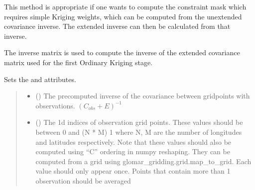 \documentclass[letterpaper,10pt,english]{sphinxmanual}
\begin{document}
\begin{fulllineitems}
\begin{fulllineitems}
\sphinxAtStartPar
This method is appropriate if one wants to compute the constraint mask
which requires simple Kriging weights, which can be computed from the
unextended covariance inverse. The extended inverse can then be
calculated from that inverse.

\sphinxAtStartPar
The inverse matrix is used to compute the inverse of the extended
covariance matrix used for the first Ordinary Kriging stage.

\sphinxAtStartPar
Sets the  and  attributes.
\begin{quote}\begin{description}
\begin{itemize}
\item {}
\sphinxAtStartPar
{} () \textendash{} The pre\sphinxhyphen{}computed inverse of the covariance between grid\sphinxhyphen{}points with
observations. \((C_{obs} + E)^{-1}\)

\item {}
\sphinxAtStartPar
{} (\sphinxstyleliteralemphasis{\sphinxupquote{{[}}}\sphinxstyleliteralemphasis{\sphinxupquote{{]} }}\sphinxstyleliteralemphasis{\sphinxupquote{| }}\sphinxstyleliteralemphasis{\sphinxupquote{{[}}}\sphinxstyleliteralemphasis{\sphinxupquote{{]}}}) \textendash{} The 1d indices of observation grid points. These values should be
between 0 and (N * M) \sphinxhyphen{} 1 where N, M are the number of longitudes
and latitudes respectively. Note that these values should also be
computed using “C” ordering in numpy reshaping. They can be
computed from a grid using glomar\_gridding.grid.map\_to\_grid. Each
value should only appear once. Points that contain more than 1
observation should be averaged

\end{itemize}

\sphinxAtStartPar
{}

\end{description}\end{quote}


\end{fulllineitems}
\end{fulllineitems}
\end{document}
